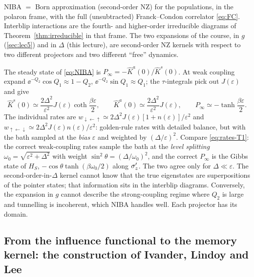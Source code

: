 \begin{keybox}
NIBA $=$ Born approximation (second-order NZ) for the populations, in the polaron frame, with the full (unsubtracted) Franck--Condon correlator \eqref{eq:FC}.
Interblip interactions are the fourth- and higher-order irreducible diagrams of Theorem~\ref{thm:irreducible} in that frame.
The two expansions of the course, in $g$ (\cref{sec:lec5}) and in $\Delta$ (this lecture), are second-order NZ kernels with respect to two different projectors and two different ``free'' dynamics.
\end{keybox}

\begin{exbox}
The steady state of \cref{eq:NIBA} is $P_\infty=-\hat K^a(0)/\hat K^s(0)$.
At weak coupling expand $\ee^{-Q_2}\cos Q_1\approx1-Q_2$, $\ee^{-Q_2}\sin Q_1\approx Q_1$; the $\tau$-integrals pick out $J(\varepsilon)$ and give
\begin{equation}
  \hat K^s(0)\simeq\frac{2\Delta^2}{\varepsilon^2}J(\varepsilon)\coth\frac{\beta\varepsilon}{2},\qquad
  \hat K^a(0)\simeq\frac{2\Delta^2}{\varepsilon^2}J(\varepsilon),\qquad P_\infty\simeq-\tanh\frac{\beta\varepsilon}{2}.
\end{equation}
The individual rates are $w_{\downarrow\leftarrow\uparrow}\simeq2\Delta^2J(\varepsilon)[1+n(\varepsilon)]/\varepsilon^2$ and $w_{\uparrow\leftarrow\downarrow}\simeq2\Delta^2J(\varepsilon)n(\varepsilon)/\varepsilon^2$: golden-rule rates with detailed balance, but with the bath sampled at the \emph{bias} $\varepsilon$ and weighted by $(\Delta/\varepsilon)^2$.
Compare \cref{eq:rates-T1}: the correct weak-coupling rates sample the bath at the \emph{level splitting} $\omega_0=\sqrt{\varepsilon^2+\Delta^2}$ with weight $\sin^2\theta=(\Delta/\omega_0)^2$, and the correct $P_\infty$ is the Gibbs state of $H_S$, $-\cos\theta\tanh(\beta\omega_0/2)$ along $\sigma_z'$.
The two agree only for $\Delta\ll\varepsilon$.
The second-order-in-$\Delta$ kernel cannot know that the true eigenstates are superpositions of the pointer states; that information sits in the interblip diagrams.
Conversely, the expansion in $g$ cannot describe the strong-coupling regime where $Q_2$ is large and tunnelling is incoherent, which NIBA handles well.
Each projector has its domain.
\end{exbox}

\subsection{From the influence functional to the memory kernel: the construction of Ivander, Lindoy and Lee}
\label{sec:ill}

